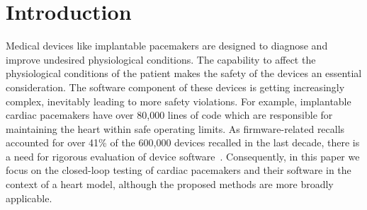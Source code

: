 \section{Introduction}
\label{introduction}

Medical devices like implantable pacemakers are designed to diagnose and improve undesired physiological conditions. The capability to affect the physiological conditions of the patient makes the safety of the devices an essential consideration. 
The software component of these devices is getting increasingly complex, inevitably leading to more safety violations.
For example, implantable cardiac pacemakers have over 80,000 lines of code which are responsible for maintaining the heart within safe operating limits. As firmware-related recalls accounted for over 41\% of the 600,000 devices recalled in the last decade, there is a need for rigorous evaluation of device software~\cite{recalls}. 
Consequently, in this paper we focus on the closed-loop testing of cardiac pacemakers and their software in the context of a heart model, although the proposed methods are more broadly applicable.

